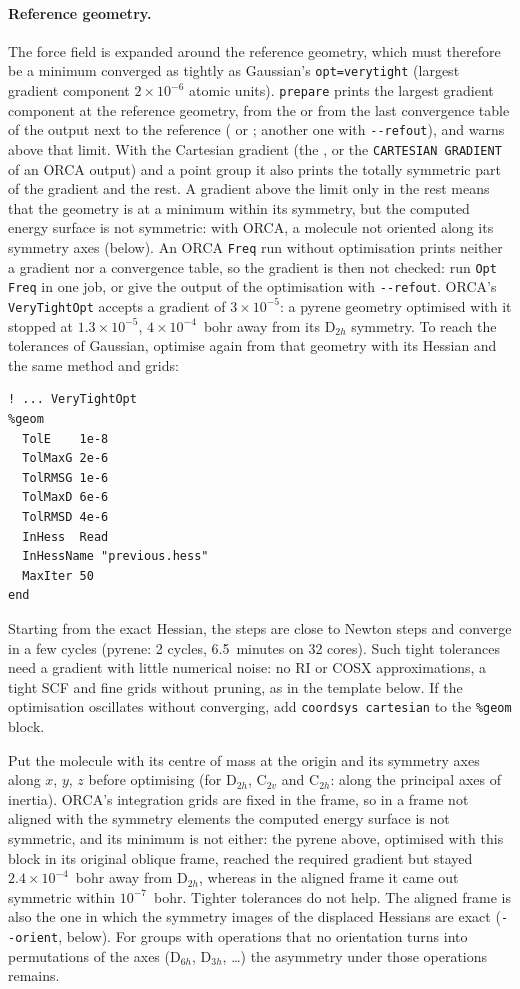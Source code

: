 \paragraph{Reference geometry.} The force field is expanded around the
reference geometry, which must therefore be a minimum converged as
tightly as Gaussian's \texttt{opt=verytight} (largest gradient component
$2\times10^{-6}$ atomic units). \texttt{prepare} prints the largest
gradient component at the reference geometry, from the  or
from the last convergence table of the output next to the reference
( or ; another one with \texttt{-{}-refout}), and
warns above that limit. With the Cartesian gradient (the , or
the \texttt{CARTESIAN GRADIENT} of an ORCA output) and a point group it
also prints the totally symmetric part of the gradient and the rest. A
gradient above the limit only in the rest means that the geometry is at
a minimum within its symmetry, but the computed energy surface is not
symmetric: with ORCA, a molecule not oriented along its symmetry axes
(below). An ORCA \texttt{Freq} run without optimisation prints neither a
gradient nor a convergence table, so the gradient is then not checked:
run \texttt{Opt Freq} in one job, or give the output of the optimisation
with \texttt{-{}-refout}. ORCA's \texttt{VeryTightOpt} accepts a gradient
of $3\times10^{-5}$: a pyrene geometry optimised with it stopped at
$1.3\times10^{-5}$, $4\times10^{-4}$~bohr away from its D$_{2h}$
symmetry. To reach the tolerances of Gaussian, optimise again from that
geometry with its Hessian and the same method and grids:
\begin{lstlisting}
! ... VeryTightOpt
%geom
  TolE    1e-8
  TolMaxG 2e-6
  TolRMSG 1e-6
  TolMaxD 6e-6
  TolRMSD 4e-6
  InHess  Read
  InHessName "previous.hess"
  MaxIter 50
end
\end{lstlisting}
Starting from the exact Hessian, the steps are close to Newton steps and
converge in a few cycles (pyrene: 2 cycles, 6.5~minutes on 32 cores).
Such tight tolerances need a gradient with little numerical noise: no RI
or COSX approximations, a tight SCF and fine grids without pruning, as
in the template below. If the optimisation oscillates without
converging, add \texttt{coordsys cartesian} to the \texttt{\%geom} block.

Put the molecule with its centre of mass at the origin and its symmetry
axes along $x$, $y$, $z$ before optimising (for D$_{2h}$, C$_{2v}$ and
C$_{2h}$: along the principal axes of inertia). ORCA's integration grids
are fixed in the frame, so in a frame not aligned with the symmetry
elements the computed energy surface is not symmetric, and its minimum
is not either: the pyrene above, optimised with this block in its
original oblique frame, reached the required gradient but stayed
$2.4\times10^{-4}$~bohr away from D$_{2h}$, whereas in the aligned frame
it came out symmetric within $10^{-7}$~bohr. Tighter tolerances do not
help. The aligned frame is also the one in which the symmetry images of
the displaced Hessians are exact (\texttt{-{}-orient}, below). For groups
with operations that no orientation turns into permutations of the axes
(D$_{6h}$, D$_{3h}$, \ldots) the asymmetry under those operations
remains.

